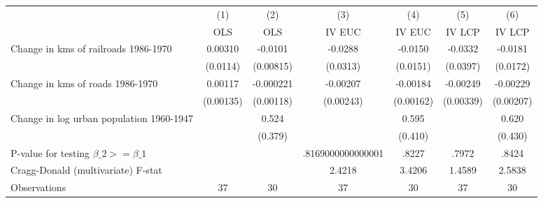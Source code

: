 {
\def\sym#1{\ifmmode^{#1}\else\(^{#1}\)\fi}
\begin{tabular}{l*{6}{c}}
\hline\hline
                &\multicolumn{1}{c}{(1)}&\multicolumn{1}{c}{(2)}&\multicolumn{1}{c}{(3)}&\multicolumn{1}{c}{(4)}&\multicolumn{1}{c}{(5)}&\multicolumn{1}{c}{(6)}\\
                &\multicolumn{1}{c}{OLS}&\multicolumn{1}{c}{OLS}&\multicolumn{1}{c}{IV EUC}&\multicolumn{1}{c}{IV EUC}&\multicolumn{1}{c}{IV LCP}&\multicolumn{1}{c}{IV LCP}\\
\hline
Change in kms of railroads 1986-1970&  0.00310         &  -0.0101         &  -0.0288         &  -0.0150         &  -0.0332         &  -0.0181         \\
                & (0.0114)         &(0.00815)         & (0.0313)         & (0.0151)         & (0.0397)         & (0.0172)         \\
[1em]
Change in kms of roads 1986-1970&  0.00117         &-0.000221         & -0.00207         & -0.00184         & -0.00249         & -0.00229         \\
                &(0.00135)         &(0.00118)         &(0.00243)         &(0.00162)         &(0.00339)         &(0.00207)         \\
[1em]
Change in log urban population 1960-1947&                  &    0.524         &                  &    0.595         &                  &    0.620         \\
                &                  &  (0.379)         &                  &  (0.410)         &                  &  (0.430)         \\
\hline
P-value for testing $\beta\_{2} >= \beta\_{1}$&                  &                  &.8169000000000001         &    .8227         &    .7972         &    .8424         \\
Cragg-Donald (multivariate) F-stat&                  &                  &   2.4218         &   3.4206         &   1.4589         &   2.5838         \\
Observations    &       37         &       30         &       37         &       30         &       37         &       30         \\
\hline\hline
\end{tabular}
}
